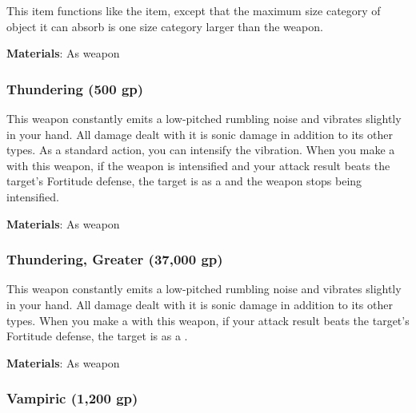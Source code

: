 This item functions like the  item, except that the maximum size category of object it can absorb is one size category larger than the weapon.



\vspace{0.25em}
\textbf{Materials}: As weapon


\lowercase{\hypertarget{item:Thundering}{}}\label{item:Thundering}
\hypertarget{item:Thundering}{\subsubsection{Thundering\hfill{} (500 gp)}}

This weapon constantly emits a low-pitched rumbling noise and vibrates slightly in your hand.
All damage dealt with it is sonic damage in addition to its other types.
As a standard action, you can intensify the vibration.
When you make a  with this weapon, if the weapon is intensified and your attack result beats the target's Fortitude defense,
the target is \deafened as a  and the weapon stops being intensified.



\vspace{0.25em}
\textbf{Materials}: As weapon


\lowercase{\hypertarget{item:Thundering, Greater}{}}\label{item:Thundering, Greater}
\hypertarget{item:Thundering, Greater}{\subsubsection{Thundering, Greater\hfill{} (37,000 gp)}}

This weapon constantly emits a low-pitched rumbling noise and vibrates slightly in your hand.
All damage dealt with it is sonic damage in addition to its other types.
When you make a  with this weapon, if your attack result beats the target's Fortitude defense, the target is \deafened as a .



\vspace{0.25em}
\textbf{Materials}: As weapon


\lowercase{\hypertarget{item:Vampiric}{}}\label{item:Vampiric}
\hypertarget{item:Vampiric}{\subsubsection{Vampiric\hfill{} (1,200 gp)}}

